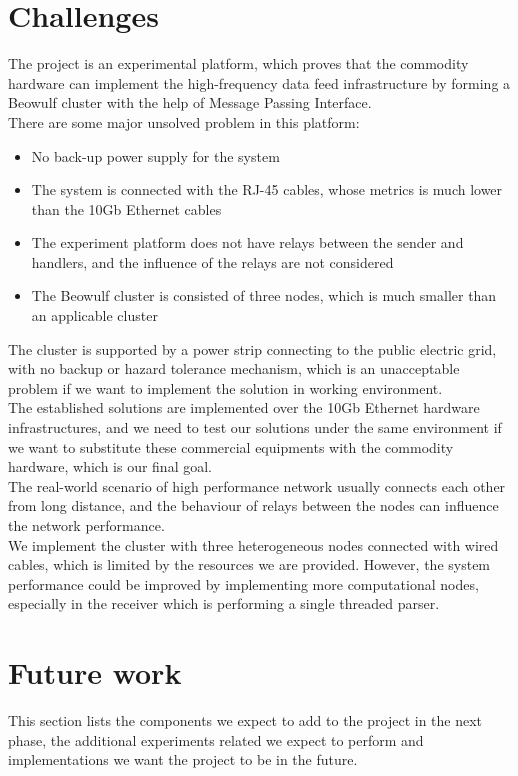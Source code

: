 \documentclass[11pt,openright,a4paper]{report}
\begin{document}
\section{Challenges}
The project is an experimental platform, which proves that the commodity hardware can implement the high-frequency data feed infrastructure by forming a Beowulf cluster with the help of Message Passing Interface.\\
There are some major unsolved problem in this platform:\\
\begin{itemize}
	\item No back-up power supply for the system
	\item The system is connected with the RJ-45 cables, whose metrics is much lower than the 10Gb Ethernet cables
	\item The experiment platform does not have relays between the sender and handlers, and the influence of the relays are not considered
	\item The Beowulf cluster is consisted of three nodes, which is much smaller than an applicable cluster
\end{itemize}
The cluster is supported by a power strip connecting to the public electric grid, with no backup or hazard tolerance mechanism, which is an unacceptable problem if we want to implement the solution in working environment.\\   
The established solutions are implemented over the 10Gb Ethernet hardware infrastructures, and we need to test our solutions under the same environment if we want to substitute these commercial equipments with the commodity hardware, which is our final goal.\\
The real-world scenario of high performance network usually connects each other from long distance, and the behaviour of relays between the nodes can influence the network performance.\\
We implement the cluster with three heterogeneous nodes connected with wired cables, which is limited by the resources we are provided. However, the system performance could be improved by implementing more computational nodes, especially in the receiver which is performing a single threaded parser.\\
\section{Future work}
This section lists the components we expect to add to the project in the next phase, the additional experiments related we expect to perform and implementations we want the project to be in the future.\\
\end{document}
